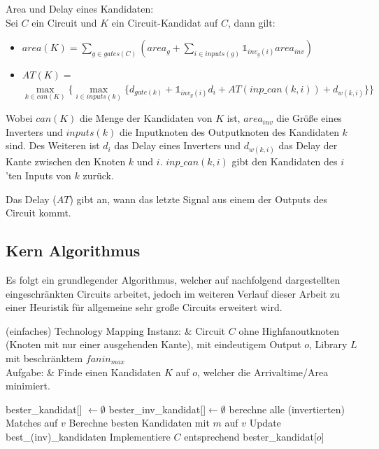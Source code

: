\documentclass[11pt, a4paper, german]{article}
\begin{document}
\begin{definition}{Area und Delay eines Kandidaten:}\\
\label{def:area_delay}
Sei $C$ ein Circuit und $K$ ein Circuit-Kandidat auf $C$, dann gilt: \\
\begin{itemize}
\item $area(K) = \sum_{g \in gates(C)} (area_g + \sum_{i \in inputs(g)} \mathbb{1}_{inv_g(i)} area_{inv})$ 
\item $AT(K) = $\\$  \max\limits_{k \in can(K)} \{\max\limits_{i \in inputs(k)} \{   d_{gate(k)} + \mathbb{1}_{inv_g(i)} d_{i} + AT(inp\_can(k,i)) + d_{w(k,i)} \} \}$ 
\end{itemize}
Wobei $can(K)$ die Menge der Kandidaten von $K$ ist, $area_{inv}$ die Größe eines Inverters und $inputs(k)$ die Inputknoten des Outputknoten des Kandidaten $k$ sind. Des Weiteren ist $d_i$ das Delay eines Inverters und $d_{w(k,i)} $ das Delay der Kante zwischen den Knoten $k$ und $i$. $inp\_can(k,i)$ gibt den Kandidaten des $i$'ten Inputs von $k$ zurück. 

\end{definition}

Das Delay ($AT$) gibt an, wann das letzte Signal aus einem der Outputs des Circuit kommt.

\subsection{Kern Algorithmus}
\label{subsec:kern_algorithmus}

Es folgt ein grundlegender Algorithmus, welcher auf nachfolgend dargestellten eingeschränkten Circuits arbeitet, jedoch im weiteren Verlauf dieser Arbeit zu einer Heuristik für allgemeine sehr große Circuits erweitert wird.

\begin{problem}[framed]{(einfaches) Technology Mapping}
  Instanz:  & Circuit $C$ ohne Highfanoutknoten (Knoten mit nur einer ausgehenden Kante), mit eindeutigem Output $o$, Library $L$ mit beschr\"anktem $fanin_{max}$\\
  Aufgabe: &  Finde einen Kandidaten $K$ auf $o$, welcher die Arrivaltime/Area minimiert.
\end{problem}

\begin{algorithm}[H]
 \LinesNumbered
 \DontPrintSemicolon
 \caption{(einfaches) Technology Mapping}

 bester\_kandidat[] $\gets \emptyset$\;
 bester\_inv\_kandidat[]$ \gets \emptyset$\;
 {
   berechne alle (invertierten) Matches auf $v$\;
   {
      Berechne besten Kandidaten mit $m$ auf $v$\;
      Update best\_(inv)\_kandidaten\;
   }
 }
 Implementiere $C$ entsprechend bester\_kandidat[$o$]\;
\end{algorithm}\ \\
\end{document}
